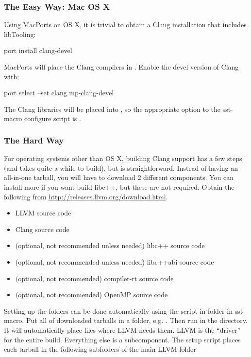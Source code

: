 \subsubsection{The Easy Way: Mac OS X}
\label{subsubsec:libToolingOSX}
Using MacPorts on OS X, it is trivial to obtain a Clang installation that includes libTooling:

\begin{ViFile}
port install clang-devel
\end{ViFile}

MacPorts will place the Clang compilers in .  Enable the devel version of Clang with:

\begin{ViFile}
port select --set clang mp-clang-devel
\end{ViFile}

The Clang libraries will be placed into , so the appropriate option to the sst-macro configure script is .

\subsubsection{The Hard Way}
\label{subsubsec:libTooling}
For operating systems other than OS X, building Clang support has a few steps (and takes quite a while to build), but is straightforward.
Instead of having an all-in-one tarball, you will have to download 2 different components. You can install more if you want build libc++, but these are not required.
Obtain the following from \url{http://releases.llvm.org/download.html}.

\begin{itemize}
\item LLVM source code
\item Clang source code
\item (optional, not recommended unless needed) libc++ source code
\item (optional, not recommended unless needed) libc++abi source code
\item (optional, not recommended) compiler-rt source code
\item (optional, not recommended) OpenMP source code
\end{itemize}

Setting up the folders can be done automatically using the  script in  folder in sst-macro. Put all of downloaded tarballs in a folder, e.g. . Then run  in the directory. 
It will automatically place files where LLVM needs them.
LLVM is the ``driver'' for the entire build. Everything else is a subcomponent. 
The setup script places each tarball in the following subfolders of the main LLVM folder

